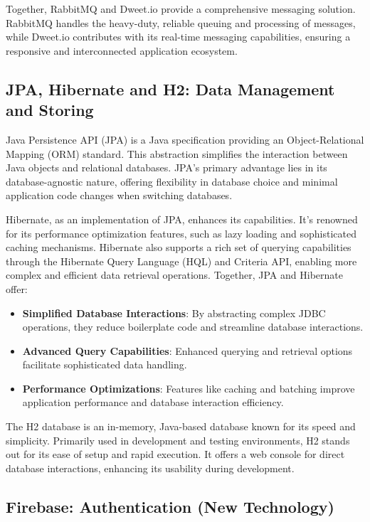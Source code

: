 Together, RabbitMQ and Dweet.io provide a comprehensive messaging solution. RabbitMQ handles the heavy-duty, reliable queuing and processing of messages, while Dweet.io contributes with its real-time messaging capabilities, ensuring a responsive and interconnected application ecosystem.



\subsection{JPA, Hibernate and H2: Data Management and Storing}

Java Persistence API (JPA) is a Java specification providing an Object-Relational Mapping (ORM) standard. 
This abstraction simplifies the interaction between Java objects and relational databases. 
JPA's primary advantage lies in its database-agnostic nature, offering flexibility in database choice and minimal application code changes when switching databases.


Hibernate, as an implementation of JPA, enhances its capabilities. 
It's renowned for its performance optimization features, such as lazy loading and sophisticated caching mechanisms. 
Hibernate also supports a rich set of querying capabilities through the Hibernate Query Language (HQL) and Criteria API, enabling more complex and efficient data retrieval operations. Together, JPA and Hibernate offer:

\begin{itemize}
  \item \textbf{Simplified Database Interactions}: By abstracting complex JDBC operations, they reduce boilerplate code and streamline database interactions.
  \item \textbf{Advanced Query Capabilities}: Enhanced querying and retrieval options facilitate sophisticated data handling.
  \item \textbf{Performance Optimizations}: Features like caching and batching improve application performance and database interaction efficiency.
\end{itemize}

The H2 database is an in-memory, Java-based database known for its speed and simplicity. 
Primarily used in development and testing environments, H2 stands out for its ease of setup and rapid execution. 
It offers a web console for direct database interactions, enhancing its usability during development.



\subsection{Firebase: Authentication (New Technology)}

